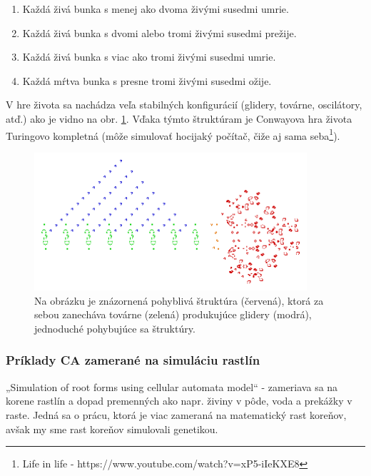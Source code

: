 \documentclass[12pt]{article}
\begin{document}
\begin{enumerate}
	\item Každá živá bunka s menej ako dvoma živými susedmi umrie.
	\item Každá živá bunka s dvomi alebo tromi živými susedmi prežije.
	\item Každá živá bunka s viac ako tromi živými susedmi umrie.
	\item Každá mŕtva bunka s presne tromi živými susedmi ožije.
\end{enumerate}

V hre života sa nachádza veľa stabilných konfigurácií (glidery, továrne,
oscilátory, atď.) ako je vidno na obr. \ref{obr:conwayova hra zivota}.
Vďaka týmto štruktúram je Conwayova hra života Turingovo kompletná (môže
simulovať hocijaký počítač, čiže aj sama seba\footnote
{Life in life - https://www.youtube.com/watch?v=xP5-iIeKXE8}).

\begin{figure}[ht]
	\centering
	\includegraphics[width=0.9\textwidth]{res/Conways_game_of_life_breeder.png}
	\caption{Na obrázku je znázornená pohyblivá štruktúra (červená), ktorá
		za sebou zanecháva továrne (zelená) produkujúce glidery (modrá),
		jednoduché pohybujúce sa štruktúry.}
	\label{obr:conwayova hra zivota}
\end{figure}

\subsubsection{Príklady CA zamerané na simuláciu rastlín}

„Simulation of root forms using cellular automata model“ - zameriava sa na
korene rastlín a dopad premenných ako napr. živiny v pôde, voda a prekážky
v raste. Jedná sa o prácu, ktorá je viac zameraná na matematický rast koreňov,
avšak my sme rast koreňov simulovali genetikou.
\end{document}
